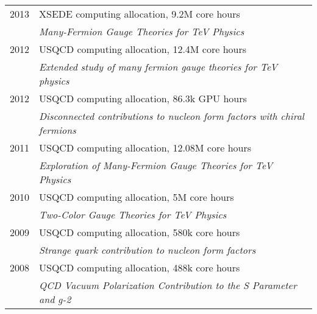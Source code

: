 \begin{spacelist}
\begin{tabular}[t]{cl}
      2013 & XSEDE computing allocation, 9.2M core hours                                                                                                       \\ %
           & \textit{Many-Fermion Gauge Theories for TeV Physics}                                                                                              \\[6 pt]
      2012 & USQCD computing allocation, 12.4M core hours                                                                                                      \\ %
           & \textit{Extended study of many fermion gauge theories for TeV physics}                                                                            \\[6 pt]
      2012 & USQCD computing allocation, 86.3k GPU hours                                                                                                       \\ %
           & \textit{Disconnected contributions to nucleon form factors with chiral fermions}                                                                  \\[6 pt]
      2011 & USQCD computing allocation, 12.08M core hours                                                                                                     \\ %
           & \textit{Exploration of Many-Fermion Gauge Theories for TeV Physics}                                                                               \\[6 pt]
      2010 & USQCD computing allocation, 5M core hours                                                                                                         \\ %
           & \textit{Two-Color Gauge Theories for TeV Physics}                                                                                                 \\[6 pt]
      2009 & USQCD computing allocation, 580k core hours                                                                                                       \\ %
           & \textit{Strange quark contribution to nucleon form factors}                                                                                       \\[6 pt]
      2008 & USQCD computing allocation, 488k core hours                                                                                                       \\ %
           & \textit{QCD Vacuum Polarization Contribution to the S Parameter and g-2}                                                                          \\[6 pt]
    \end{tabular}
\end{spacelist}
